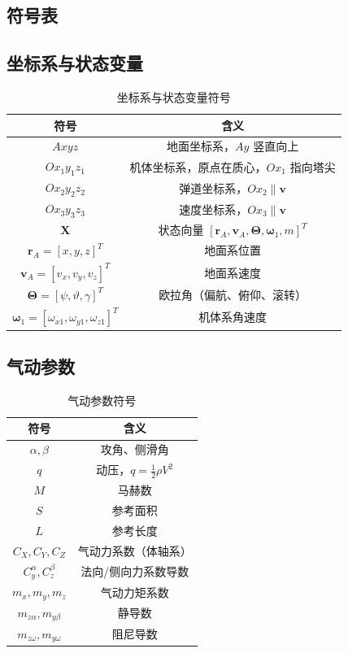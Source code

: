 
\begin{thesisappendix}

\section{符号表}

\subsection{坐标系与状态变量}

\begin{table}[H]
\caption{坐标系与状态变量符号}
\label{tab:sym_coord}
\begin{tabularx}{\textwidth}{>{\hsize}C >{\hsize}C}
\toprule
符号 & 含义 \\
\midrule
$Axyz$ & 地面坐标系，$Ay$ 竖直向上 \\
$Ox_1y_1z_1$ & 机体坐标系，原点在质心，$Ox_1$ 指向塔尖 \\
$Ox_2y_2z_2$ & 弹道坐标系，$Ox_2\parallel\mathbf v$ \\
$Ox_3y_3z_3$ & 速度坐标系，$Ox_3\parallel\mathbf v$ \\
$\mathbf X$ & 状态向量 $[\mathbf r_A,\mathbf v_A,\boldsymbol\Theta,\boldsymbol\omega_1,m]^T$ \\
$\mathbf r_A=[x,y,z]^T$ & 地面系位置 \\
$\mathbf v_A=[v_x,v_y,v_z]^T$ & 地面系速度 \\
$\boldsymbol\Theta=[\psi,\vartheta,\gamma]^T$ & 欧拉角（偏航、俯仰、滚转） \\
$\boldsymbol\omega_1=[\omega_{x1},\omega_{y1},\omega_{z1}]^T$ & 机体系角速度 \\
\bottomrule
\end{tabularx}
\end{table}

\subsection{气动参数}

\begin{table}[H]
\caption{气动参数符号}
\label{tab:sym_aero}
\begin{tabularx}{\textwidth}{>{\hsize}C >{\hsize}C}
\toprule
符号 & 含义 \\
\midrule
$\alpha,\beta$ & 攻角、侧滑角 \\
$q$ & 动压，$q=\frac12\rho V^2$ \\
$M$ & 马赫数 \\
$S$ & 参考面积 \\
$L$ & 参考长度 \\
$C_X,C_Y,C_Z$ & 气动力系数（体轴系） \\
$C_y^\alpha,C_z^\beta$ & 法向/侧向力系数导数 \\
$m_x,m_y,m_z$ & 气动力矩系数 \\
$m_{z\alpha},m_{y\beta}$ & 静导数 \\
$m_{z\omega},m_{y\omega}$ & 阻尼导数 \\
\bottomrule
\end{tabularx}
\end{table}


\end{thesisappendix}
